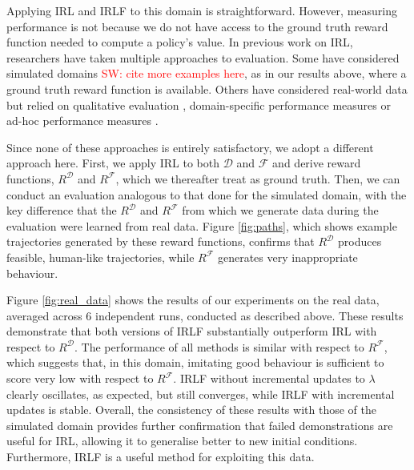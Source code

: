 \documentclass[letterpaper]{article}
\newcommand{\sw}[1]{\textcolor{red}{SW: #1}}
\newcommand{\sw}[1]{}
\begin{document}
Applying IRL and IRLF to this domain is straightforward.  However, measuring performance is not because we do not have access to the ground truth reward function needed to compute a policy's value. In previous work on IRL, researchers have taken multiple approaches to evaluation.  Some have considered simulated domains \cite{levine2011nonlinear} \sw{cite more examples here}, as in our results above, where a ground truth reward function is available.  Others have considered real-world data but relied on qualitative evaluation \cite{ratliff2006maximum}, domain-specific performance measures \cite{neu2009training} or ad-hoc performance measures \cite{vasquez2014inverse}.

Since none of these approaches is entirely satisfactory, we adopt a different approach here.  First, we apply IRL to both $\mathcal{D}$ and $\mathcal{F}$ and derive reward functions, $R^{\mathcal{D}}$ and $R^{\mathcal{F}}$, which we thereafter treat as ground truth.  Then, we can conduct an evaluation analogous to that done for the simulated domain, with the key difference that the $R^{\mathcal{D}}$ and $R^{\mathcal{F}}$ from which we generate data during the evaluation were learned from real data. Figure \ref{fig:paths}, which shows example trajectories generated by these reward functions, confirms that $R^{\mathcal{D}}$ produces feasible, human-like trajectories, while $R^{\mathcal{F}}$ generates very inappropriate behaviour.

Figure \ref{fig:real_data} shows the results of our experiments on the real data, averaged across 6 independent runs, conducted as described above.  These results demonstrate that both versions of IRLF substantially outperform IRL with respect to $R^{\mathcal{D}}$.  The performance of all methods is similar with respect to $R^{\mathcal{F}}$, which suggests that, in this domain, imitating good behaviour is sufficient to score very low with respect to $R^{\mathcal{F}}$.  IRLF without incremental updates to $\lambda$ clearly oscillates, as expected, but still converges, while IRLF with incremental updates is stable.
%
Overall, the consistency of these results with those of the simulated domain provides further confirmation that failed demonstrations are useful for IRL, allowing it to generalise better to new initial conditions.  Furthermore, IRLF is a useful method for exploiting this data.
\end{document}
